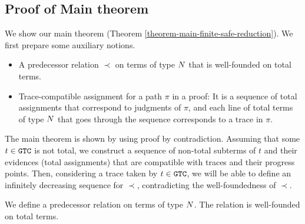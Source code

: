 

%
%


\subsection{Proof of Main theorem}

We show our main theorem (Theorem \ref{theorem-main-finite-safe-reduction}). 
We first prepare some auxiliary notions.
\begin{itemize}
\item
  A predecessor relation $\prec$ on terms of type ${N}$ that is well-founded on total terms. 
\item
  Trace-compatible assignment for a path $\pi$ in a proof:
  It is a sequence of total assignments that correspond to judgments of $\pi$,
  and each line of total terms of type ${N}$ that goes through the sequence corresponds to a trace in $\pi$.
\end{itemize}
The main theorem is shown by using proof by contradiction. Assuming that some $t\in{\tt GTC}$ is not total,
we construct a sequence of non-total subterms of $t$ and their evidences (total assignments)
that are compatible with traces and their progress points.
Then, considering a trace taken by $t\in{\tt GTC}$, we will be able to define 
an infinitely decreasing sequence for $\prec$, contradicting the well-foundedness of $\prec$. 

We define a predecessor relation on terms of type ${N}$.
The relation is well-founded on total terms. 

